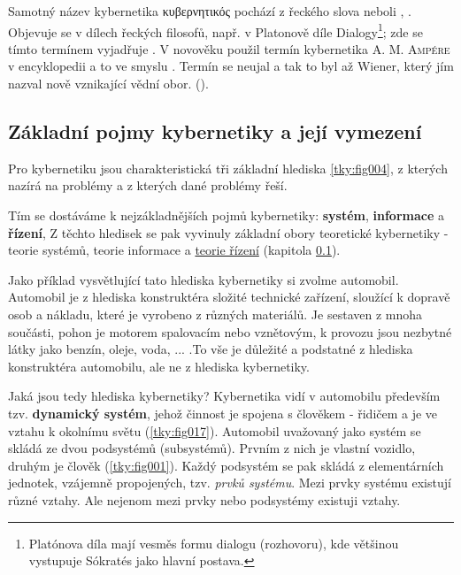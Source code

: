     Samotný název kybernetika \foreignlanguage{greek}{κυβερνητικός} pochází z řeckého slova
     neboli , . Objevuje se v dílech řeckých
    filosofů, např. v Platonově díle Dialogy\footnote{Platónova díla mají vesměs formu dialogu
    (rozhovoru), kde většinou vystupuje Sókratés jako hlavní postava.}; zde se tímto termínem
    vyjadřuje . V novověku použil termín
    kybernetika \textsc{A. M. Ampére} v encyklopedii a to ve smyslu .
    Termín se neujal a tak to byl až Wiener, který jím nazval nově vznikající vědní obor.
    (\cite[s.~6]{Svarc1986}).

    \subsection{Základní pojmy kybernetiky a její vymezení}
      Pro kybernetiku jsou charakteristická tři základní hlediska \ref{tky:fig004}, z kterých nazírá
      na problémy a z kterých dané problémy řeší.

      
      Tím se dostáváme k nejzákladnějších pojmů kybernetiky: \textbf{systém}, \textbf{informace} a
      \textbf{řízení}, Z těchto hledisek se pak vyvinuly základní obory teoretické kybernetiky -
      teorie systémů, teorie informace a \hyperlink{tky:regulace}{teorie řízení} (kapitola \ref{}).
      
      Jako příklad vysvětlující tato hlediska kybernetiky si zvolme automobil. Automobil je z 
      hlediska konstruktéra složité technické zařízení, sloužící k dopravě osob a nákladu, které je 
      vyrobeno z různých materiálů. Je sestaven z mnoha součásti, pohon je motorem spalovacím nebo 
      vznětovým, k provozu jsou nezbytné látky jako benzín, oleje, voda, ... .To vše je důležité a 
      podstatné z hlediska konstruktéra automobilu, ale ne z hlediska kybernetiky.


      Jaká jsou tedy hlediska kybernetiky? Kybernetika vidí v automobilu především tzv.
      \textbf{dynamický systém}, jehož činnost je spojena s člověkem - řidičem a je ve vztahu k
      okolnímu světu (\ref{tky:fig017}). Automobil uvažovaný jako systém se skládá ze dvou
      podsystémů (subsystémů). Prvním z nich je vlastní vozidlo, druhým je člověk
      (\ref{tky:fig001}). Každý podsystém se pak skládá z elementárních jednotek, vzájemně
      propojených, tzv. \emph{prvků systému}. Mezi prvky systému existují různé vztahy. Ale nejenom
      mezi prvky nebo podsystémy existuji vztahy.

